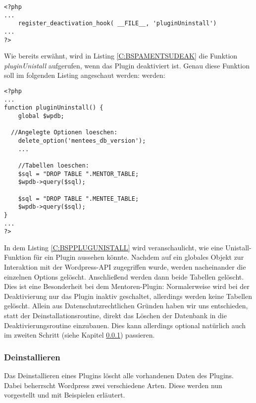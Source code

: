 \begin{lstlisting}
<?php
...
	register_deactivation_hook( __FILE__, 'pluginUninstall')
...
?>
\end{lstlisting}
Wie bereits erwähnt, wird in Listing \ref{C:BSPAMENTSUDEAK} die Funktion \emph{pluginUnistall} aufgerufen, wenn das Plugin deaktiviert ist. Genau diese Funktion soll im folgenden Listing angeschaut werden:
werden:
\begin{lstlisting}
<?php
...
function pluginUninstall() {
	global $wpdb;
	
  //Angelegte Optionen loeschen:
	delete_option('mentees_db_version');
    ...
	
	//Tabellen loeschen:
    $sql = "DROP TABLE ".MENTOR_TABLE;
	$wpdb->query($sql);

	$sql = "DROP TABLE ".MENTEE_TABLE;
	$wpdb->query($sql);
}
...
?>
\end{lstlisting}
In dem Listing \ref{C:BSPPLUGUNISTALL} wird veranschaulicht, wie eine Unistall-Funktion für ein Plugin aussehen könnte. Nachdem auf ein globales Objekt zur Interaktion mit der Wordpress-API zugegriffen wurde, werden nacheinander die einzelnen Options gelöscht. Anschließend werden dann beide Tabellen gelöscht. Dies ist eine Besonderheit bei dem Mentoren-Plugin: Normalerweise wird bei der Deaktivierung nur das Plugin inaktiv geschaltet, allerdings werden keine Tabellen gelöscht. \newline
Allein aus Datenschutzrechtlichen Gründen haben wir uns entschieden, statt der Deinstallationsroutine, direkt das Löschen der Datenbank in die Deaktivierungsroutine einzubauen. Dies kann allerdings optional natürlich auch im zweiten Schritt (siehe Kapitel \ref{Deinstallieren}) passieren.
\subsubsection{Deinstallieren}\label{Deinstallieren}
Das Deinstallieren eines Plugins löscht alle vorhandenen Daten des Plugins. Dabei beherrscht Wordpress zwei verschiedene Arten. Diese werden nun vorgestellt und mit Beispielen erläutert. 
